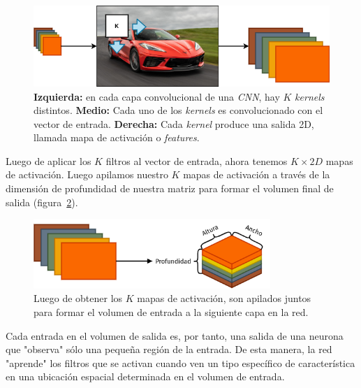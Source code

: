 \documentclass[a4paper,12pt]{article}
\begin{document}
\begin{figure}[H]
	\begin{center}				
		\includegraphics[width=1\textwidth]{feature-map-clean.png}
		\caption{\textbf{Izquierda:} en cada capa convolucional de una \textit{CNN}, hay $K$ \textit{kernels} distintos. \textbf{Medio:} Cada uno de los \textit{kernels} es convolucionado con el vector de entrada. \textbf{Derecha:} Cada \textit{kernel} produce una salida 2D, llamada mapa de activación o \textit{features}.}
		\label{fig:conv-mechanism}
	\end{center}
\end{figure}

Luego de aplicar los $K$ filtros al vector de entrada, ahora tenemos $K \times 2D$ mapas de activación. Luego apilamos nuestro $K$ mapas de activación a través de la dimensión de profundidad de nuestra matriz para formar el volumen final de salida (figura~\ref{fig:k-maps}).

\begin{figure}[H]
	\begin{center}				
		\includegraphics[width=0.8\textwidth]{k-activation-map.png}
		\caption{Luego de obtener los $K$ mapas de activación, son apilados juntos para formar el volumen de entrada a la siguiente capa en la red.}
		\label{fig:k-maps}
	\end{center}
\end{figure}

\clearpage

Cada entrada en el volumen de salida es, por tanto, una salida de una neurona que "observa" sólo una pequeña región de la entrada. De esta manera, la red "aprende" los filtros que se activan cuando ven un tipo específico de característica en una ubicación espacial determinada en el volumen de entrada.
\end{document}
